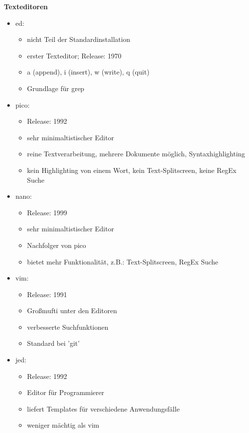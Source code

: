 \documentclass{article}
\begin{document}
\textbf{Texteditoren}
\begin{itemize}
	\item ed:
	\begin{itemize}
		\item nicht Teil der Standardinstallation
		\item erster Texteditor; Release: 1970
		\item a (append), i (insert), w (write), q (quit)
		\item Grundlage für grep
	\end{itemize}
	\item pico:
	\begin{itemize}
		\item Release: 1992
		\item sehr minimaltistischer Editor
		\item reine Textverarbeitung, mehrere Dokumente möglich, Syntaxhighlighting
		\item kein Highlighting von einem Wort, kein Text-Splitscreen, keine RegEx Suche 
	\end{itemize}
	\item nano:
	\begin{itemize}
		\item Release: 1999
		\item sehr minimaltistischer Editor
		\item Nachfolger von pico
		\item bietet mehr Funktionalität, z.B.: Text-Splitscreen, RegEx Suche
	\end{itemize}
	\item vim:
	\begin{itemize}
		\item Release: 1991
		\item Großmufti unter den Editoren
		\item verbesserte Suchfunktionen
		\item Standard bei 'git'
	\end{itemize}
	\item jed:
	\begin{itemize}
		\item Release: 1992
		\item Editor für Programmierer
		\item liefert Templates für verschiedene Anwendungsfälle
		\item weniger mächtig als vim
	\end{itemize}
\end{itemize}
\end{document}
